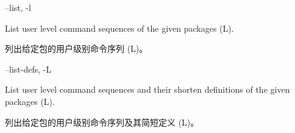 \documentclass{article}
\newenvironment{options}{%
    \def\cstart{\begingroup\ttfamily\par\noindent\ignorespaces}%
    \def\csep{\endgroup\begingroup\list {}{}\item \relax}%
    \def\cend{\endlist\par\medskip\endgroup\cstart}%
    \cstart
}{%
    \endgroup
}
\begin{document}
\begin{options}
--list, -l                                         \csep 
List user level command sequences of the given packages (L).

列出给定包的用户级别命令序列 (L)。
\cend
\end{options}

\begin{options}
--list-defs, -L                                    \csep 
List user level command sequences and their shorten definitions of the given packages (L).

列出给定包的用户级别命令序列及其简短定义 (L)。
\cend
\end{options}

\begin{options}

\end{options}
  
\end{document}
